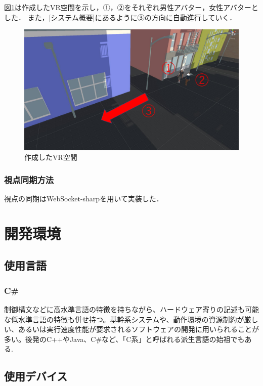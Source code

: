\documentclass[12pt,a4j,titlepage]{ltjsarticle}
\begin{document}
図\ref{fig:screen}は作成したVR空間を示し，①，②をそれぞれ男性アバター，女性アバターとした．
また，\ref{システム概要}にあるように③の方向に自動進行していく．

\begin{figure}[h]
\begin{center}
\includegraphics[keepaspectratio, scale=0.5]{screenshot.pdf}
\end{center}
 \caption{作成したVR空間}
 \label{fig:screen}
\end{figure}
\subsubsection{視点同期方法}
視点の同期はWebSocket-sharpを用いて実装した．


\clearpage

\section{開発環境}
\subsection{使用言語}
\subsubsection{C\#}
制御構文などに高水準言語の特徴を持ちながら、ハードウェア寄りの記述も可能な低水準言語の特徴も併せ持つ。基幹系システムや、動作環境の資源制約が厳しい、あるいは実行速度性能が要求されるソフトウェアの開発に用いられることが多い。後発のC++やJava、C\#など、「C系」と呼ばれる派生言語の始祖でもある.

\subsection{使用デバイス} 
\end{document}
